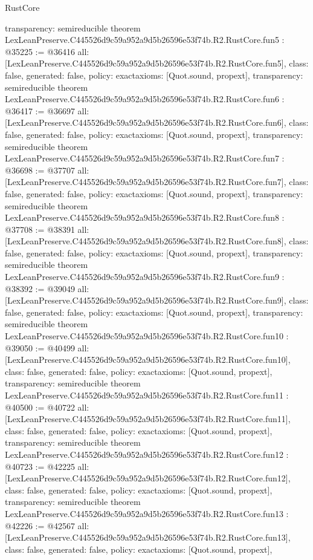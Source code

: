 \begin{lexlean}{RustCore}
\begin{coremodule}
{  transparency: semireducible
}
theorem LexLeanPreserve.C445526d9c59a952a9d5b26596e53f74b.R2.RustCore.fun5 : @35225 := @36416 {
  all: [LexLeanPreserve.C445526d9c59a952a9d5b26596e53f74b.R2.RustCore.fun5],
  class: false,
  generated: false,
  policy: exact{axioms: [Quot.sound, propext]},
  transparency: semireducible
}
theorem LexLeanPreserve.C445526d9c59a952a9d5b26596e53f74b.R2.RustCore.fun6 : @36417 := @36697 {
  all: [LexLeanPreserve.C445526d9c59a952a9d5b26596e53f74b.R2.RustCore.fun6],
  class: false,
  generated: false,
  policy: exact{axioms: [Quot.sound, propext]},
  transparency: semireducible
}
theorem LexLeanPreserve.C445526d9c59a952a9d5b26596e53f74b.R2.RustCore.fun7 : @36698 := @37707 {
  all: [LexLeanPreserve.C445526d9c59a952a9d5b26596e53f74b.R2.RustCore.fun7],
  class: false,
  generated: false,
  policy: exact{axioms: [Quot.sound, propext]},
  transparency: semireducible
}
theorem LexLeanPreserve.C445526d9c59a952a9d5b26596e53f74b.R2.RustCore.fun8 : @37708 := @38391 {
  all: [LexLeanPreserve.C445526d9c59a952a9d5b26596e53f74b.R2.RustCore.fun8],
  class: false,
  generated: false,
  policy: exact{axioms: [Quot.sound, propext]},
  transparency: semireducible
}
theorem LexLeanPreserve.C445526d9c59a952a9d5b26596e53f74b.R2.RustCore.fun9 : @38392 := @39049 {
  all: [LexLeanPreserve.C445526d9c59a952a9d5b26596e53f74b.R2.RustCore.fun9],
  class: false,
  generated: false,
  policy: exact{axioms: [Quot.sound, propext]},
  transparency: semireducible
}
theorem LexLeanPreserve.C445526d9c59a952a9d5b26596e53f74b.R2.RustCore.fun10 : @39050 := @40499 {
  all: [LexLeanPreserve.C445526d9c59a952a9d5b26596e53f74b.R2.RustCore.fun10],
  class: false,
  generated: false,
  policy: exact{axioms: [Quot.sound, propext]},
  transparency: semireducible
}
theorem LexLeanPreserve.C445526d9c59a952a9d5b26596e53f74b.R2.RustCore.fun11 : @40500 := @40722 {
  all: [LexLeanPreserve.C445526d9c59a952a9d5b26596e53f74b.R2.RustCore.fun11],
  class: false,
  generated: false,
  policy: exact{axioms: [Quot.sound, propext]},
  transparency: semireducible
}
theorem LexLeanPreserve.C445526d9c59a952a9d5b26596e53f74b.R2.RustCore.fun12 : @40723 := @42225 {
  all: [LexLeanPreserve.C445526d9c59a952a9d5b26596e53f74b.R2.RustCore.fun12],
  class: false,
  generated: false,
  policy: exact{axioms: [Quot.sound, propext]},
  transparency: semireducible
}
theorem LexLeanPreserve.C445526d9c59a952a9d5b26596e53f74b.R2.RustCore.fun13 : @42226 := @42567 {
  all: [LexLeanPreserve.C445526d9c59a952a9d5b26596e53f74b.R2.RustCore.fun13],
  class: false,
  generated: false,
  policy: exact{axioms: [Quot.sound, propext]},
}
\end{coremodule}
\end{lexlean}
